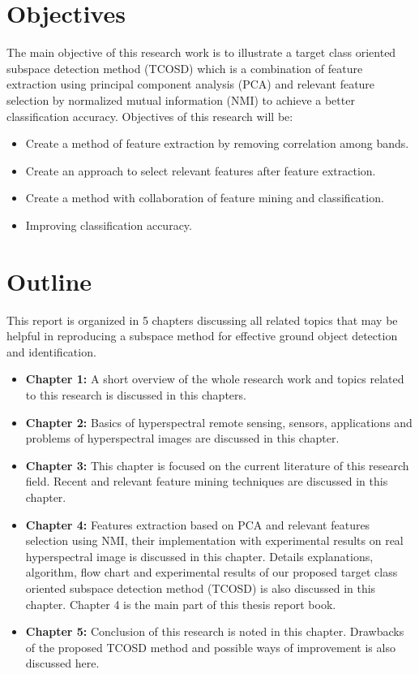 \documentclass[document.tex]{subfiles}
\begin{document}
\section{Objectives}
\noindent The main objective of this research work is to illustrate a target class oriented subspace detection method (TCOSD) which is a combination of feature extraction using principal component analysis (PCA) and relevant feature selection by normalized mutual information (NMI) to achieve a better classification accuracy. Objectives of this research will be:
\begin{itemize}
	\item Create a method of feature extraction by removing correlation among bands.
	\item Create an approach to select relevant features after feature extraction.
	\item Create a method with collaboration of feature mining and classification.
	\item Improving classification accuracy.
\end{itemize}

\section{Outline}
\noindent This report is organized in 5 chapters discussing all related topics that may be helpful in reproducing a subspace method for effective ground object detection and identification.
\begin{itemize}	
\item \textbf{Chapter 1:} A short overview of the whole research work and topics related to this research is discussed in this chapters.
\item \textbf{Chapter 2:} Basics of hyperspectral remote sensing, sensors, applications and problems of hyperspectral images are discussed in this chapter. 
\item \textbf{Chapter 3:} This chapter is focused on the current literature of this research field. Recent and relevant feature mining techniques are discussed in this chapter.
\item \textbf{Chapter 4:} Features extraction based on PCA and relevant features selection using NMI, their implementation with experimental results on real hyperspectral image is discussed in this chapter. Details explanations, algorithm, flow chart and experimental results of our proposed target class oriented subspace detection method (TCOSD) is also discussed in this chapter. Chapter 4 is the main part of this thesis report book.
\item \textbf{Chapter 5:} Conclusion of this research is noted in this chapter. Drawbacks of the proposed TCOSD method and possible ways of improvement is also discussed here.
\end{itemize}
\end{document}
